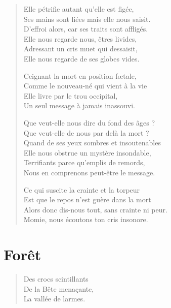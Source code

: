 \begin{verse}\sizain\quatrain%
  Elle pétrifie autant qu’elle est figée,\\  %
  Ses mains sont liées mais elle nous saisit.\\   %
  D’effroi alors, car ses traits sont affligés.\\   %
  Elle nous regarde nous, êtres livides,\\   %
  Adressant un cris muet qui dessaisit,\\   %
  Elle nous regarde de ses globes vides. 

  Ceignant la mort en position fœtale,\\   %
  Comme le nouveau-né qui vient à la vie\\   %
  Elle livre par le trou occipital,\\   %
  Un seul message à jamais inassouvi. 

  Que veut-elle nous dire du fond des âges ?\\   %
  Que veut-elle  de nous par delà la mort ?\\   %
  Quand de ses yeux sombres et insoutenables\\ 
  Elle nous obstrue un mystère insondable,\\ 
  Terrifiants parce qu’emplis de remords,\\ 
  Nous en comprenons peut-être le message. 

  Ce qui suscite la crainte et la torpeur\\   %
  Est que le repos n’est guère dans la mort\\   %
  Alors donc dis-nous tout, sans crainte ni peur.\\   %
  Momie, nous écoutons ton cris insonore. 
\end{verse}

\section*{Forêt}
\begin{verse}\haiku
Des crocs scintillants\\  %
De la Bête menaçante,\\  %
La vallée de larmes.
\end{verse}

